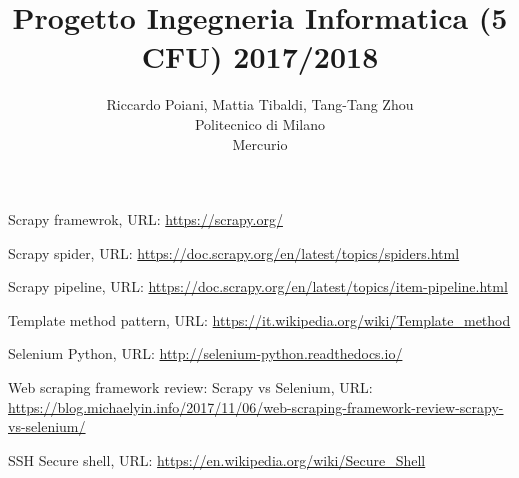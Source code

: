 \documentclass[a4paper]{article}
\begin{document}
\title{Progetto Ingegneria Informatica (5 CFU) 2017/2018}
\author{
        Riccardo Poiani, Mattia Tibaldi, Tang-Tang Zhou \\
        Politecnico di Milano\\  
        Mercurio              
}
\maketitle
\newpage
\tableofcontents
{}
\newpage




\clearpage
\begin{thebibliography}{9}
Scrapy framewrok, URL: \url{https://scrapy.org/}

Scrapy spider, URL: \url{https://doc.scrapy.org/en/latest/topics/spiders.html}

Scrapy pipeline, URL: \url{https://doc.scrapy.org/en/latest/topics/item-pipeline.html}

Template method pattern, URL: \url{https://it.wikipedia.org/wiki/Template_method}

Selenium Python, URL: \url{http://selenium-python.readthedocs.io/}

Web scraping framework review: Scrapy vs Selenium, URL: \url{https://blog.michaelyin.info/2017/11/06/web-scraping-framework-review-scrapy-vs-selenium/}

SSH Secure shell, URL: \url{https://en.wikipedia.org/wiki/Secure_Shell}

\end{thebibliography}
\end{document}

